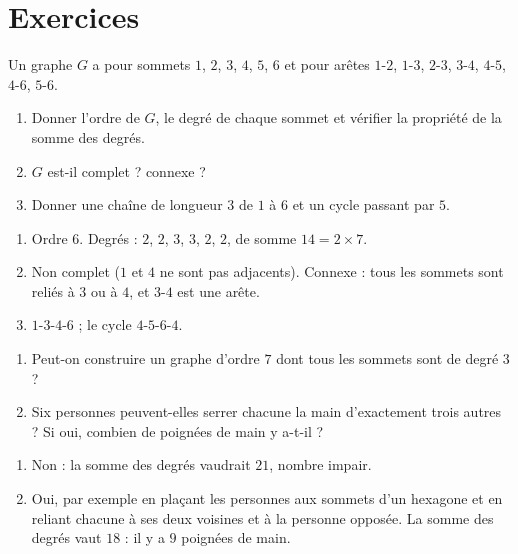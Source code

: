 \mxnewpage
\section{Exercices}
\begin{exercise}[Vocabulaire]
Un graphe $G$ a pour sommets $1$, $2$, $3$, $4$, $5$, $6$ et pour arêtes $1$-$2$, $1$-$3$, $2$-$3$, $3$-$4$, $4$-$5$, $4$-$6$, $5$-$6$.
\begin{enumerate}
\item Donner l'ordre de $G$, le degré de chaque sommet et vérifier la propriété de la somme des degrés.
\item $G$ est-il complet ? connexe ?
\item Donner une chaîne de longueur $3$ de $1$ à $6$ et un cycle passant par $5$.
\end{enumerate}
\end{exercise}
\begin{solution}
\begin{enumerate}
\item Ordre $6$. Degrés : $2$, $2$, $3$, $3$, $2$, $2$, de somme $14=2\times7$.
\item Non complet ($1$ et $4$ ne sont pas adjacents). Connexe : tous les sommets sont reliés à $3$ ou à $4$, et $3$-$4$ est une arête.
\item $1$-$3$-$4$-$6$ ; le cycle $4$-$5$-$6$-$4$.
\end{enumerate}
\end{solution}

\begin{exercise}
\begin{enumerate}
\item Peut-on construire un graphe d'ordre $7$ dont tous les sommets sont de degré $3$ ?
\item Six personnes peuvent-elles serrer chacune la main d'exactement trois autres ? Si oui, combien de poignées de main y a-t-il ?
\end{enumerate}
\end{exercise}
\begin{solution}
\begin{enumerate}
\item Non : la somme des degrés vaudrait $21$, nombre impair.
\item Oui, par exemple en plaçant les personnes aux sommets d'un hexagone et en reliant chacune à ses deux voisines et à la personne opposée. La somme des degrés vaut $18$ : il y a $9$ poignées de main.
\end{enumerate}
\end{solution}

